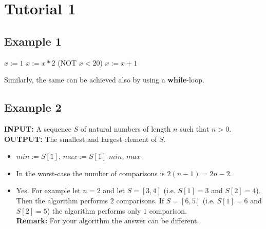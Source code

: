 \documentclass[english,twoside]{article}
\begin{document}

\pagestyle{fancy}
 \chead{}


\section*{Tutorial 1}

\subsection*{Example 1}

\begin{algorithmic}
\STATE $x := 1$
\REPEAT
\STATE $x := x*2$
\UNTIL (NOT $x<20$)
\STATE $x := x+1$

\bigskip

Similarly, the same can be achieved also by using a {\bf while}-loop.

\end{algorithmic}


\subsection*{Example 2}

{\bf INPUT:} A sequence $S$ of natural numbers of length $n$ such that
     $n > 0$. \\
{\bf OUTPUT:} The smallest and largest element of $S$.\\

\begin{itemize}
\item
 \begin{algorithmic}
   \STATE $min := S[1]$; $max := S[1]$
	  \ELSE {}
		 \ENDIF
	  \ENDIF
   \ENDFOR
    $min$, $max$
 \end{algorithmic}

\item In the worst-case the number of comparisons is $2(n-1)=2n - 2$.
\item Yes. For example let $n=2$
 and let $S=[3,4]$ (i.e. $S[1]=3$ and $S[2]=4$). Then
  the algorithm performs $2$ comparisons.
  If $S=[6,5]$ (i.e. $S[1]=6$ and $S[2]=5$) the algorithm 
  performs only $1$ comparison. \\
{\bf Remark:} For your algorithm the answer can be different.
\end{itemize}
\end{document}
